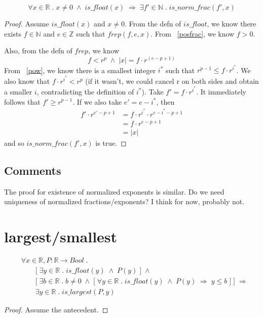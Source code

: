 \documentclass{article}
\begin{document}
\begin{thm}
\label{normfrac}
\begin{equation*}
\forall x \in \mathbb{R} \; . \; x \neq 0 \; \wedge \; is\_float(x) \; 
\Longrightarrow \; \exists f' \in \mathbb{N} \; . \; is\_norm\_frac(f', x)
\end{equation*}
\begin{proof} Assume $is\_float(x)$ and $x \neq 0$. From the defn of
$is\_float$, we know there exists $f \in \mathbb{N}$ and $e \in \mathbb{Z}$
such that $frep(f, e, x)$. From ~\ref{posfrac}, we know $f > 0$.

Also, from the defn of $frep$, we know
\begin{equation*}
f < r^p \; \wedge \; |x| = f \cdot r^{(e - p + 1)}
\end{equation*}
From ~\ref{pow}, we know there is a smallest integer $i^*$ such that
$r^{p - 1} \leq f \cdot r^{i^*}$. We also know that $f \cdot r^{i^*} < r^p$
(if it wasn't, we could cancel r on both sides and obtain a smaller
$i$, contradicting the definition of $i^*$). Take $f' = f \cdot r^{i^*}$.
It immediately follows that $f' \geq r^{p - 1}$. If we also take
$e' = e - i^*$, then
\begin{align*}
f' \cdot r^{e' - p + 1} &= f \cdot r^{i^*} \cdot r^{e - i^* - p + 1}\\
&= f \cdot r^{e - p + 1}\\
&= |x|
\end{align*}
and so $is\_norm\_frac(f', x)$ is true.
\end{proof}
\end{thm}

\subsection{Comments}

The proof for existence of normalized exponents is similar. Do we need 
uniqueness of normalized fractions/exponents? I think for now, probably not.

\section{largest/smallest}

\begin{thm}
\label{largestexists}
\begin{align*}
&\forall x \in \mathbb{R}, P:\mathbb{R} \to Bool \; . \\
&\qquad \big [ \; \exists y \in \mathbb{R} \; . \;
is\_float(y) \; \wedge \; P(y) \; \big ] \; \wedge \\
& \qquad \Big [ \; \exists b \in \mathbb{R} \; . \; 
b \neq 0 \; \wedge \; \big [ \; \forall y \in \mathbb{R} \; . 
\; is\_float(y) \; \wedge \; P(y) \; 
\Longrightarrow \; y \leq b \; \big ] \; \Big ] \; \Longrightarrow \\
& \qquad \exists y \in \mathbb{R} \; . \; is\_largest(P, y)
\end{align*}
\begin{proof} Assume the antecedent. 


\end{proof}
\end{thm}
\end{document}
